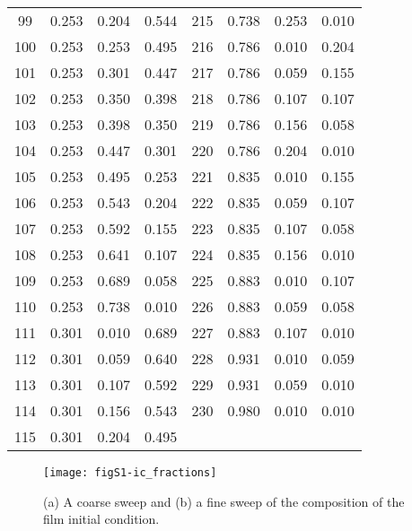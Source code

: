 \documentclass[journal=mamobx,manuscript=suppinfo]{achemso}
\begin{document}
\begin{longtable}{cccc|cccc}
99 & 0.253 & 0.204 & 0.544  & 215 & 0.738 & 0.253 & 0.010 \\
100 & 0.253 & 0.253 & 0.495 & 216 & 0.786 & 0.010 & 0.204 \\
101 & 0.253 & 0.301 & 0.447 & 217 & 0.786 & 0.059 & 0.155 \\
102 & 0.253 & 0.350 & 0.398 & 218 & 0.786 & 0.107 & 0.107 \\
103 & 0.253 & 0.398 & 0.350 & 219 & 0.786 & 0.156 & 0.058 \\
104 & 0.253 & 0.447 & 0.301 & 220 & 0.786 & 0.204 & 0.010 \\
105 & 0.253 & 0.495 & 0.253 & 221 & 0.835 & 0.010 & 0.155 \\
106 & 0.253 & 0.543 & 0.204 & 222 & 0.835 & 0.059 & 0.107 \\
107 & 0.253 & 0.592 & 0.155 & 223 & 0.835 & 0.107 & 0.058 \\
108 & 0.253 & 0.641 & 0.107 & 224 & 0.835 & 0.156 & 0.010 \\
109 & 0.253 & 0.689 & 0.058 & 225 & 0.883 & 0.010 & 0.107 \\
110 & 0.253 & 0.738 & 0.010 & 226 & 0.883 & 0.059 & 0.058 \\
111 & 0.301 & 0.010 & 0.689 & 227 & 0.883 & 0.107 & 0.010 \\
112 & 0.301 & 0.059 & 0.640 & 228 & 0.931 & 0.010 & 0.059 \\
113 & 0.301 & 0.107 & 0.592 & 229 & 0.931 & 0.059 & 0.010 \\
114 & 0.301 & 0.156 & 0.543 & 230 & 0.980 & 0.010 & 0.010 \\
115 & 0.301 & 0.204 & 0.495 &       &       &       &       \\
\hline
\end{longtable}

\begin{figure}
\texttt{[image: figS1-ic\_fractions]}
\caption{(a) A coarse sweep and (b) a fine sweep of the composition of the film initial condition.}
\label{fig-ic_fractions}
\end{figure}

%
%
%
\end{document}
